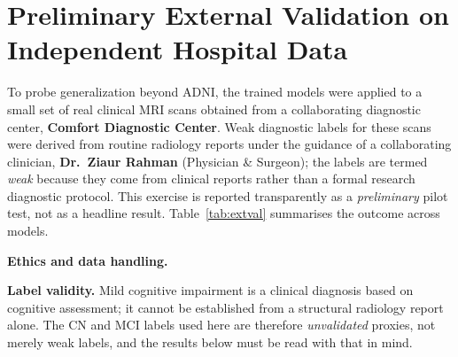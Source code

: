 \section{Preliminary External Validation on Independent Hospital Data}\label{sec:extval}
To probe generalization beyond ADNI, the trained models were applied to a small set of real clinical MRI scans obtained from a collaborating diagnostic center, \textbf{Comfort Diagnostic Center}. Weak diagnostic labels for these scans were derived from routine radiology reports under the guidance of a collaborating clinician, \textbf{Dr.\ Ziaur Rahman} (Physician \& Surgeon); the labels are termed \emph{weak} because they come from clinical reports rather than a formal research diagnostic protocol. This exercise is reported transparently as a \emph{preliminary} pilot test, not as a headline result. Table~\ref{tab:extval} summarises the outcome across models.

\textbf{Ethics and data handling.} 

\textbf{Label validity.} Mild cognitive impairment is a clinical diagnosis based on cognitive assessment; it cannot be established from a structural radiology report alone. The CN and MCI labels used here are therefore \emph{unvalidated} proxies, not merely weak labels, and the results below must be read with that in mind.

\begin{table}[H]
\centering
\caption{\textbf{Preliminary hospital external-testing results.} Each ADNI-trained model applied to the hospital pilot set ($n=8$: 4 CN, 4 MCI; no AD cases). ``Hosp AUC$^{*}$'' is CN-vs-MCI ranking quality on the pilot set.}
\label{tab:extval}
\end{table}

